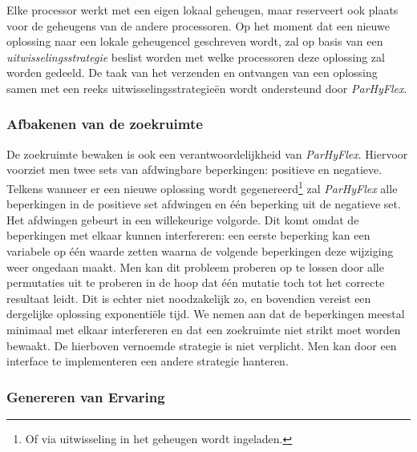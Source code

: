 Elke processor werkt met een eigen lokaal geheugen, maar reserveert ook plaats voor de geheugens van de andere processoren. Op het moment dat een nieuwe oplossing naar een lokale geheugencel geschreven wordt, zal op basis van een \emph{uitwisselingsstrategie} beslist worden met welke processoren deze oplossing zal worden gedeeld. De taak van het verzenden en ontvangen van een oplossing samen met een reeks uitwisselingsstrategie\"en wordt ondersteund door \emph{ParHyFlex}.

\subsubsection{Afbakenen van de zoekruimte}
 
De zoekruimte bewaken is ook een verantwoordelijkheid van \emph{ParHyFlex}. Hiervoor voorziet men twee sets van afdwingbare beperkingen: positieve en negatieve. Telkens wanneer er een nieuwe oplossing wordt gegenereerd\footnote{Of via uitwisseling in het geheugen wordt ingeladen.} zal \emph{ParHyFlex} alle beperkingen in de positieve set afdwingen en \'e\'en beperking uit de negatieve set. Het afdwingen gebeurt in een willekeurige volgorde. Dit komt omdat de beperkingen met elkaar kunnen interfereren: een eerste beperking kan een variabele op \'e\'en waarde zetten waarna de volgende beperkingen deze wijziging weer ongedaan maakt. Men kan dit probleem proberen op te lossen door alle permutaties uit te proberen in de hoop dat \'e\'en mutatie toch tot het correcte resultaat leidt. Dit is echter niet noodzakelijk zo, en bovendien vereist een dergelijke oplossing exponenti\"ele tijd. We nemen aan dat de beperkingen meestal minimaal met elkaar interfereren en dat een zoekruimte niet strikt moet worden bewaakt. De hierboven vernoemde strategie is niet verplicht. Men kan door een interface te implementeren een andere strategie hanteren.

\subsubsection{Genereren van Ervaring}
 
